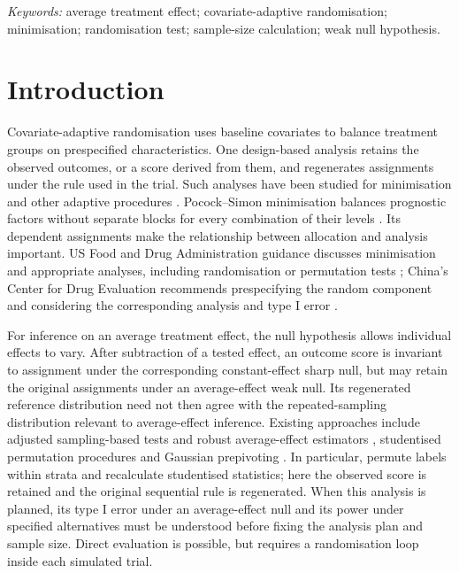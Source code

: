 \documentclass[12pt,a4paper]{article}
\theoremstyle{definition}
\begin{document}
\noindent\textit{Keywords:} average treatment effect; covariate-adaptive randomisation; minimisation; randomisation test; sample-size calculation; weak null hypothesis.

\section{Introduction}

Covariate-adaptive randomisation uses baseline covariates to balance treatment groups on prespecified characteristics. One design-based analysis retains the observed outcomes, or a score derived from them, and regenerates assignments under the rule used in the trial. Such analyses have been studied for minimisation and other adaptive procedures \citep{GailEtAl1988,HasegawaTango2009,SimonSimon2011,ParhatEtAl2014,ProschanDodd2019}. Pocock--Simon minimisation balances prognostic factors without separate blocks for every combination of their levels \citep{PocockSimon1975,CoartEtAl2023}. Its dependent assignments make the relationship between allocation and analysis important. US Food and Drug Administration guidance discusses minimisation and appropriate analyses, including randomisation or permutation tests \citep[Section~V.E]{FDA2019Adaptive}; China's Center for Drug Evaluation recommends prespecifying the random component and considering the corresponding analysis and type I error \citep[Sections~II(4) and~IV(3)]{NMPA2022Randomization}.

For inference on an average treatment effect, the null hypothesis allows individual effects to vary. After subtraction of a tested effect, an outcome score is invariant to assignment under the corresponding constant-effect sharp null, but may retain the original assignments under an average-effect weak null. Its regenerated reference distribution need not then agree with the repeated-sampling distribution relevant to average-effect inference. Existing approaches include adjusted sampling-based tests and robust average-effect estimators \citep{ShaoEtAl2010,ShaoYu2013,MaEtAl2015,MaEtAl2020,YeEtAl2022,YeEtAl2023}, studentised permutation procedures \citep{BugniCanayShaikh2018,WuDing2021,ZhaoDing2021} and Gaussian prepivoting \citep{CohenFogarty2022}. In particular, \citet{BugniCanayShaikh2018} permute labels within strata and recalculate studentised statistics; here the observed score is retained and the original sequential rule is regenerated. When this analysis is planned, its type I error under an average-effect null and its power under specified alternatives must be understood before fixing the analysis plan and sample size. Direct evaluation is possible, but requires a randomisation loop inside each simulated trial.
\end{document}

